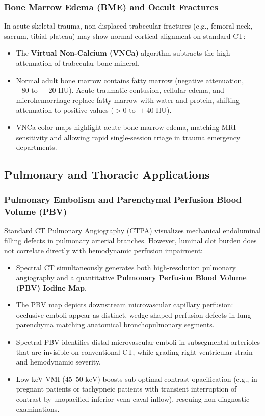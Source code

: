 \documentclass[11pt,a4paper]{article}
\begin{document}
\subsubsection{Bone Marrow Edema (BME) and Occult Fractures}
In acute skeletal trauma, non-displaced trabecular fractures (e.g., femoral neck, sacrum, tibial plateau) may show normal cortical alignment on standard CT:
\begin{itemize}[leftmargin=2em]
    \item The \textbf{Virtual Non-Calcium (VNCa)} algorithm subtracts the high attenuation of trabecular bone mineral.
    \item Normal adult bone marrow contains fatty marrow (negative attenuation, $-80\text{ to }-20\text{ HU}$). Acute traumatic contusion, cellular edema, and microhemorrhage replace fatty marrow with water and protein, shifting attenuation to positive values ($> 0\text{ to }+40\text{ HU}$).
    \item VNCa color maps highlight acute bone marrow edema, matching MRI sensitivity and allowing rapid single-session triage in trauma emergency departments.
\end{itemize}

\subsection{Pulmonary and Thoracic Applications}

\subsubsection{Pulmonary Embolism and Parenchymal Perfusion Blood Volume (PBV)}
Standard CT Pulmonary Angiography (CTPA) visualizes mechanical endoluminal filling defects in pulmonary arterial branches. However, luminal clot burden does not correlate directly with hemodynamic perfusion impairment:
\begin{itemize}[leftmargin=2em]
    \item Spectral CT simultaneously generates both high-resolution pulmonary angiography and a quantitative \textbf{Pulmonary Perfusion Blood Volume (PBV) Iodine Map}.
    \item The PBV map depicts downstream microvascular capillary perfusion: occlusive emboli appear as distinct, wedge-shaped perfusion defects in lung parenchyma matching anatomical bronchopulmonary segments.
    \item Spectral PBV identifies distal microvascular emboli in subsegmental arterioles that are invisible on conventional CT, while grading right ventricular strain and hemodynamic severity.
    \item Low-keV VMI ($45\text{--}50\text{ keV}$) boosts sub-optimal contrast opacification (e.g., in pregnant patients or tachypneic patients with transient interruption of contrast by unopacified inferior vena caval inflow), rescuing non-diagnostic examinations.
\end{itemize}
\end{document}
